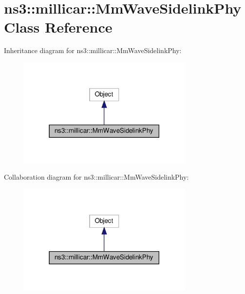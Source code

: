 \hypertarget{classns3_1_1millicar_1_1MmWaveSidelinkPhy}{}\section{ns3\+:\+:millicar\+:\+:Mm\+Wave\+Sidelink\+Phy Class Reference}
\label{classns3_1_1millicar_1_1MmWaveSidelinkPhy}


Inheritance diagram for ns3\+:\+:millicar\+:\+:Mm\+Wave\+Sidelink\+Phy\+:
\nopagebreak
\begin{figure}[H]
\begin{center}
\leavevmode
\includegraphics[width=249pt]{classns3_1_1millicar_1_1MmWaveSidelinkPhy__inherit__graph}
\end{center}
\end{figure}


Collaboration diagram for ns3\+:\+:millicar\+:\+:Mm\+Wave\+Sidelink\+Phy\+:
\nopagebreak
\begin{figure}[H]
\begin{center}
\leavevmode
\includegraphics[width=249pt]{classns3_1_1millicar_1_1MmWaveSidelinkPhy__coll__graph}
\end{center}
\end{figure}
